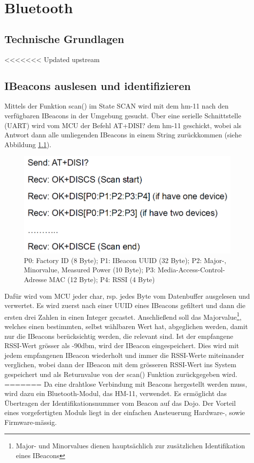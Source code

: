 \chapter{Bluetooth}
\label{Bluetooth}
\thispagestyle{fancy} 
\section{Technische Grundlagen}
<<<<<<< Updated upstream
\section{IBeacons auslesen und identifizieren}
Mittels der Funktion scan() im State SCAN wird mit dem hm-11 nach den verfügbaren IBeacons in der Umgebung gesucht. Über eine serielle Schnittstelle (UART) wird vom MCU der Befehl AT+DISI? dem hm-11 geschickt, wobei als Antwort dann alle umliegenden IBeacons in einem String zurückkommen (siehe Abbildung \ref{fig:disiCommand}).
\begin{figure}[h]
\centering
\includegraphics[scale=0.7]{Bilder/disi_command.PNG} 
\caption[Rückgabe des AR+DISI? Befehls]{P0: Factory ID (8 Byte); P1: IBeacon UUID (32 Byte); P2: Major-, Minorvalue, Measured Power (10 Byte); P3: Media-Access-Control-Adresse MAC (12 Byte); P4: RSSI (4 Byte) \cite{hm11Datasheet}}
\label{fig:disiCommand}
\end{figure}
Dafür wird vom MCU jeder char, rsp. jedes Byte vom Datenbuffer ausgelesen und verwertet. Es wird zuerst nach einer UUID eines IBeacons gefiltert und dann die ersten drei Zahlen in einen Integer gecastet. Anschließend soll das Majorvalue\footnote{Major- und Minorvalues dienen hauptsächlich zur zusätzlichen Identifikation eines IBeacons}, welches einen bestimmten, selbst wählbaren Wert hat, abgeglichen werden, damit nur die IBeacons berücksichtig werden, die relevant sind. Ist der empfangene RSSI-Wert grösser als -90dbm, wird der IBeacon eingespeichert. Dies wird mit jedem empfangenen IBeacon wiederholt und immer die RSSI-Werte miteinander verglichen, wobei dann der IBeacon mit dem grösseren RSSI-Wert ins System gespeichert und als Returnvalue von der scan() Funktion zurückgegeben wird.
=======
Da eine drahtlose Verbindung mit Beacons hergestellt werden muss, wird dazu ein Bluetooth-Modul, das HM-11, verwendet. Es ermöglicht das Übertragen der Identifikationsnummer vom Beacon auf das Dojo. Der Vorteil eines vorgefertigten Moduls liegt in der einfachen Ansteuerung Hardware-, sowie Firmware-mässig.

